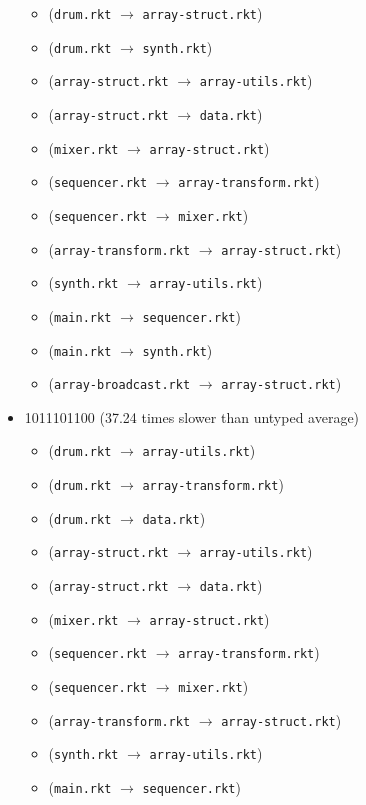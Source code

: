 \documentclass{article}
\newcommand{\mono}[1]{\texttt{#1}}
\begin{document}
\begin{itemize}
  \begin{itemize}
  \item (\mono{drum.rkt} $\rightarrow$ \mono{array-struct.rkt})
  \item (\mono{drum.rkt} $\rightarrow$ \mono{synth.rkt})
  \item (\mono{array-struct.rkt} $\rightarrow$ \mono{array-utils.rkt})
  \item (\mono{array-struct.rkt} $\rightarrow$ \mono{data.rkt})
  \item (\mono{mixer.rkt} $\rightarrow$ \mono{array-struct.rkt})
  \item (\mono{sequencer.rkt} $\rightarrow$ \mono{array-transform.rkt})
  \item (\mono{sequencer.rkt} $\rightarrow$ \mono{mixer.rkt})
  \item (\mono{array-transform.rkt} $\rightarrow$ \mono{array-struct.rkt})
  \item (\mono{synth.rkt} $\rightarrow$ \mono{array-utils.rkt})
  \item (\mono{main.rkt} $\rightarrow$ \mono{sequencer.rkt})
  \item (\mono{main.rkt} $\rightarrow$ \mono{synth.rkt})
  \item (\mono{array-broadcast.rkt} $\rightarrow$ \mono{array-struct.rkt})
  \end{itemize}
\item 1011101100 (37.24 times slower than untyped average)
  \begin{itemize}
  \item (\mono{drum.rkt} $\rightarrow$ \mono{array-utils.rkt})
  \item (\mono{drum.rkt} $\rightarrow$ \mono{array-transform.rkt})
  \item (\mono{drum.rkt} $\rightarrow$ \mono{data.rkt})
  \item (\mono{array-struct.rkt} $\rightarrow$ \mono{array-utils.rkt})
  \item (\mono{array-struct.rkt} $\rightarrow$ \mono{data.rkt})
  \item (\mono{mixer.rkt} $\rightarrow$ \mono{array-struct.rkt})
  \item (\mono{sequencer.rkt} $\rightarrow$ \mono{array-transform.rkt})
  \item (\mono{sequencer.rkt} $\rightarrow$ \mono{mixer.rkt})
  \item (\mono{array-transform.rkt} $\rightarrow$ \mono{array-struct.rkt})
  \item (\mono{synth.rkt} $\rightarrow$ \mono{array-utils.rkt})
  \item (\mono{main.rkt} $\rightarrow$ \mono{sequencer.rkt})

\end{itemize}
\end{itemize}
\end{document}
